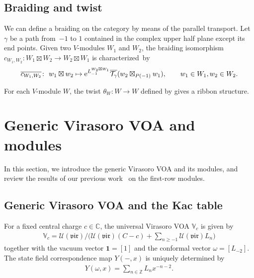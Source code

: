 \documentclass[pdftex]{sigma}
\numberwithin{equation}{section}
\newcommand{\ol}[1]{\overline{#1}}
\newcommand{\bC}{\mathbb{C}}
\newcommand{\bZ}{\mathbb{Z}}
\newcommand{\cT}{\mathcal{T}}
\newcommand{\cU}{\mathcal{U}}
\newcommand{\bbmi}{\mathbbm{i}}
\newcommand{\UEA}{\cU}
\newcommand{\voagen}{V}
\newcommand{\voamodgen}{W}
\newcommand{\voavac}{\mathbf{1}}
\newcommand{\voaY}{Y}
\newcommand{\voaconf}{\omega}
\newcommand{\vmodvec}{w}
\newcommand{\virvoa}{\mathbb{V}}
\newcommand{\vir}{\mathfrak{vir}}
\begin{document}
\subsection{Braiding and twist}
\label{sect:HL_braiding}
We can define a braiding on the category by means of the parallel transport.
Let $\gamma$ be a path from~$-1$ to $1$ contained in the complex upper half plane except its end points.
Given two $\voagen$-modules $\voamodgen_{1}$ and $\voamodgen_{2}$, the braiding isomorphism $c_{\voamodgen_{1},\voamodgen_{2}}\colon \voamodgen_{1}\boxtimes\voamodgen_{2}\to \voamodgen_{2}\boxtimes \voamodgen_{1}$ is characterized~by
\begin{gather*}
 \ol{c_{\voamodgen_{1},\voamodgen_{2}}}\colon\ \vmodvec_{1}\boxtimes\vmodvec_{2}\mapsto {\rm e}^{L^{\voamodgen_{2}\boxtimes\voamodgen_{1}}_{-1}}\ol{\cT_{\gamma}}(\vmodvec_{2}\boxtimes_{P(-1)}\vmodvec_{1}),\qquad \vmodvec_{1}\in\voamodgen_{1}, \vmodvec_{2}\in \voamodgen_{2}.
\end{gather*}

For each $\voagen$-module $\voamodgen$, the twist $\theta_{\voamodgen}\colon \voamodgen\to\voamodgen$ defined by \smash{$\theta_{\voamodgen}={\rm e}^{2\pi\bbmi L_{0}^{\voamodgen}}$} gives a ribbon structure.


\section{Generic Virasoro VOA and modules}
\label{sect:generic_VirVOA}
In this section, we introduce the generic Virasoro VOA and its modules, and review the results of our previous work~\cite{KoshidaKytola2022} on the first-row modules.

\subsection{Generic Virasoro VOA and the Kac table}
For a fixed central charge $c\in \bC$, the universal Virasoro VOA $\virvoa_{c}$ is given by
\begin{gather*}
 \virvoa_{c}=\UEA (\vir)/\big(\UEA (\vir)(C-c)+\textstyle{\sum_{n\geq -1}}\UEA (\vir)L_{n}\big)
\end{gather*}
together with the vacuum vector $\voavac=[1]$ and the conformal vector $\voaconf=[L_{-2}]$.
The state field correspondence map $\voaY(-,x)$ is uniquely determined by
\begin{gather*}
 \voaY(\voaconf,x)=\sum_{n\in\bZ}L_{n}x^{-n-2}.
\end{gather*}
\end{document}
